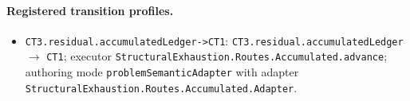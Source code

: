 \paragraph{Registered transition profiles.}
\begin{itemize}
\item \texttt{CT3.\allowbreak{}residual.\allowbreak{}accumulated\allowbreak{}Ledger-\allowbreak{}>CT1}: \texttt{CT3.\allowbreak{}residual.\allowbreak{}accumulated\allowbreak{}Ledger} $\to$ \texttt{CT1}; executor \texttt{Structural\allowbreak{}Exhaustion.\allowbreak{}Routes.\allowbreak{}Accumulated.\allowbreak{}advance}; authoring mode \texttt{problem\allowbreak{}Semantic\allowbreak{}Adapter} with adapter \texttt{Structural\allowbreak{}Exhaustion.\allowbreak{}Routes.\allowbreak{}Accumulated.\allowbreak{}Adapter}.
\end{itemize}
\endgroup
